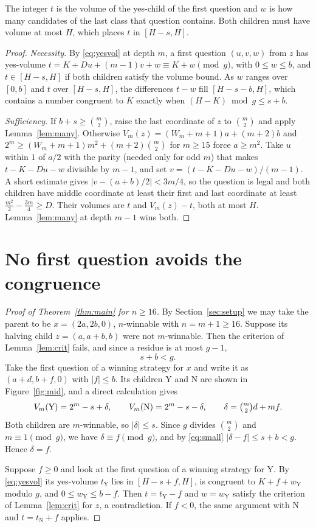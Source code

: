 \documentclass[11pt]{amsart}
\theoremstyle{definition}
\newcommand{\Y}{\mathrm{Y}}
\newcommand{\N}{\mathrm{N}}
\begin{document}
The integer $t$ is the volume of the yes-child of the first question and $w$ is how many candidates of the last class
that question contains. Both children must have volume at most $H$, which places $t$ in $[H-s,H]$.

\begin{proof}
\emph{Necessity.} By \eqref{eq:yesvol} at depth $m$, a first question $(u,v,w)$ from $z$ has yes-volume
$t=K+Du+(m-1)v+w\equiv K+w\pmod g$, with $0\le w\le b$, and $t\in[H-s,H]$ if both children satisfy the volume bound.
As $w$ ranges over $[0,b]$ and $t$ over $[H-s,H]$, the differences $t-w$ fill $[H-s-b,H]$, which contains a number
congruent to $K$ exactly when $(H-K)\bmod g\le s+b$.

\emph{Sufficiency.} If $b+s\ge\binom m2$, raise the last coordinate of $z$ to $\binom m2$ and apply
Lemma~\ref{lem:many}. Otherwise $V_m(z)=(W_m+m+1)a+(m+2)b$ and $2^m\ge(W_m+m+1)m^2+(m+2)\binom m2$ for $m\ge15$ force
$a\ge m^2$. Take $u$ within $1$ of $a/2$ with the parity (needed only for odd $m$) that makes $t-K-Du-w$ divisible by
$m-1$, and set $v=(t-K-Du-w)/(m-1)$. A short estimate gives $|v-(a+b)/2|<3m/4$, so the question is legal and both
children have middle coordinate at least their first and last coordinate at least $\tfrac{m^2}2-\tfrac{3m}4\ge D$.
Their volumes are $t$ and $V_m(z)-t$, both at most $H$. Lemma~\ref{lem:many} at depth $m-1$ wins both.
\end{proof}

\section{No first question avoids the congruence}\label{sec:key}

\begin{proof}[Proof of Theorem~\ref{thm:main} for $n\ge16$]
By Section~\ref{sec:setup} we may take the parent to be $x=(2a,2b,0)$, $n$-winnable with $n=m+1\ge16$. Suppose its
halving child $z=(a,a+b,b)$ were not $m$-winnable. Then the criterion of Lemma~\ref{lem:crit} fails, and since a
residue is at most $g-1$,
\begin{equation}\label{eq:small}
s+b<g .
\end{equation}
Take the first question of a winning strategy for $x$ and write it as $(a+d,b+f,0)$ with $|f|\le b$. Its children
$\Y$ and $\N$ are shown in Figure~\ref{fig:mid}, and a direct calculation gives
\[
V_m(\Y)=2^m-s+\delta,\qquad V_m(\N)=2^m-s-\delta,\qquad \delta=\tbinom m2d+mf .
\]
Both children are $m$-winnable, so $|\delta|\le s$. Since $g$ divides $\binom m2$ and $m\equiv1\pmod g$, we have
$\delta\equiv f\pmod g$, and by \eqref{eq:small} $|\delta-f|\le s+b<g$. Hence $\delta=f$.

Suppose $f\ge0$ and look at the first question of a winning strategy for $\Y$. By \eqref{eq:yesvol} its yes-volume
$t_\Y$ lies in $[H-s+f,H]$, is congruent to $K+f+w_\Y$ modulo $g$, and $0\le w_\Y\le b-f$. Then $t=t_\Y-f$ and
$w=w_\Y$ satisfy the criterion of Lemma~\ref{lem:crit} for $z$, a contradiction. If $f<0$, the same argument with
$\N$ and $t=t_\N+f$ applies.
\end{proof}
\end{document}
